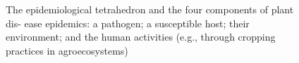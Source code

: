 \begin{figure}
\label{fig:distriangle}
\caption{The epidemiological tetrahedron and the four components of plant dis- ease epidemics: a pathogen; a susceptible host; their environment; and the human activities (e.g., through cropping practices in agroecosystems)}
\end{figure}